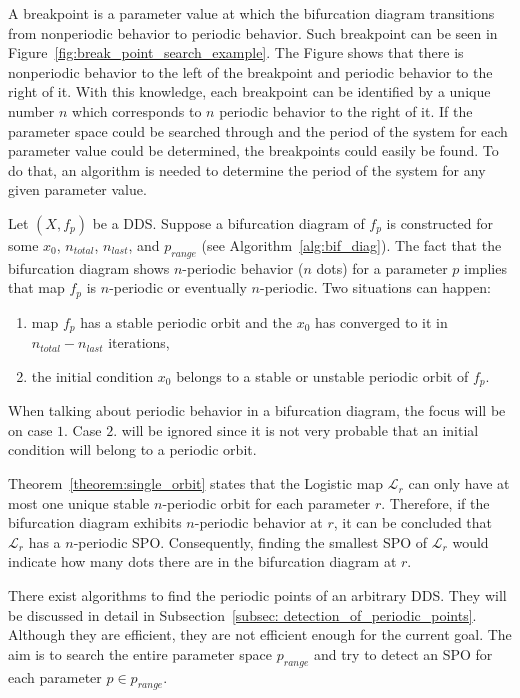 A breakpoint is a parameter value at which the bifurcation diagram transitions from nonperiodic behavior to periodic behavior.
Such breakpoint can be seen in Figure~\ref{fig:break_point_search_example}.
The Figure shows that there is nonperiodic behavior to the left of the breakpoint and periodic behavior to the right of it.
With this knowledge, each breakpoint can be identified by a unique number $n$ which corresponds to $n$ periodic behavior to the right of it.
If the parameter space could be searched through and the period of the system for each parameter value could be determined, the breakpoints could easily be found.
To do that, an algorithm is needed to determine the period of the system for any given parameter value.
\par
Let $(X, f_{p})$ be a DDS. Suppose a bifurcation diagram of $f_{p}$ is constructed for some $x_0$, $n_{total}$, $n_{last}$, and $p_{range}$ (see Algorithm~\ref{alg:bif_diag}).
The fact that the bifurcation diagram shows $n$-periodic behavior ($n$ dots) for a parameter $p$ implies that map $f_{p}$ is $n$-periodic or eventually $n$-periodic.
Two situations can happen:
\begin{enumerate}
    \item map $f_{p}$ has a stable periodic orbit and the $x_0$ has converged to it in $n_{total}-n_{last}$ iterations,
    \item the initial condition $x_0$ belongs to a stable or unstable periodic orbit of $f_p$.
\end{enumerate}
When talking about periodic behavior in a bifurcation diagram, the focus will be on case $1$.
Case $2$. will be ignored since it is not very probable that an initial condition will belong to a periodic orbit.
\par
Theorem~\ref{theorem:single_orbit} states that the Logistic map $\mathcal{L}_r$ can only have at most one unique stable $n$-periodic orbit for each parameter $r$.
Therefore, if the bifurcation diagram exhibits $n$-periodic behavior at $r$, it can be concluded that $\mathcal{L}_{r}$ has a $n$-periodic SPO.
Consequently, finding the smallest SPO of $\mathcal{L}_{r}$ would indicate how many dots there are in the bifurcation diagram at $r$.
\par
There exist algorithms to find the periodic points of an arbitrary DDS.
They will be discussed in detail in Subsection~\ref{subsec: detection_of_periodic_points}.
Although they are efficient, they are not efficient enough for the current goal.
The aim is to search the entire parameter space $p_{range}$ and try to detect an SPO for each parameter $p \in p_{range}$.
